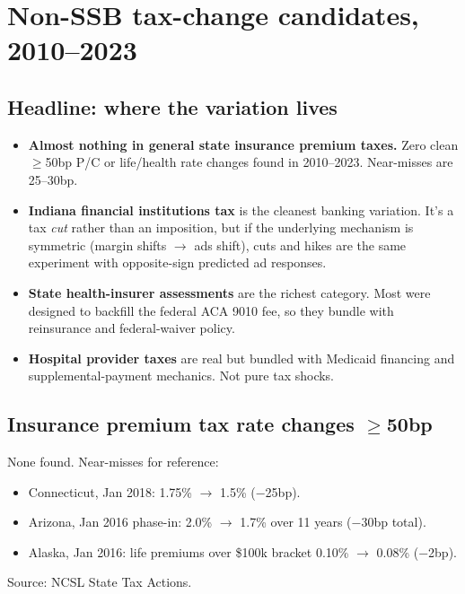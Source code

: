 
\section*{Non-SSB tax-change candidates, 2010--2023}

\subsection*{Headline: where the variation lives}

\begin{itemize}
  \item \textbf{Almost nothing in general state insurance premium
        taxes.} Zero clean $\geq$50bp P/C or life/health rate
        changes found in 2010--2023. Near-misses are 25--30bp.
  \item \textbf{Indiana financial institutions tax} is the
        cleanest banking variation. It's a tax \emph{cut}
        rather than an imposition, but if the underlying
        mechanism is symmetric (margin shifts $\to$ ads
        shift), cuts and hikes are the same experiment with
        opposite-sign predicted ad responses.
  \item \textbf{State health-insurer assessments} are the
        richest category. Most were designed to backfill the
        federal ACA 9010 fee, so they bundle with reinsurance
        and federal-waiver policy.
  \item \textbf{Hospital provider taxes} are real but bundled
        with Medicaid financing and supplemental-payment
        mechanics. Not pure tax shocks.
\end{itemize}

\subsection*{Insurance premium tax rate changes $\geq$50bp}

None found. Near-misses for reference:
\begin{itemize}
  \item Connecticut, Jan 2018: 1.75\% $\to$ 1.5\% (−25bp).
  \item Arizona, Jan 2016 phase-in: 2.0\% $\to$ 1.7\% over 11
        years (−30bp total).
  \item Alaska, Jan 2016: life premiums over \$100k bracket
        0.10\% $\to$ 0.08\% (−2bp).
\end{itemize}
Source: NCSL State Tax Actions.

